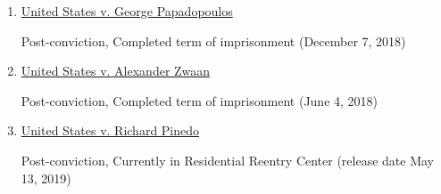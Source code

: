 \begin{enumerate}[1.]

    \item \underline{United States v. George Papadopoulos}

Post-conviction, Completed term of imprisonment (December 7, 2018)

    \item \underline{United States v. Alexander Zwaan}

Post-conviction, Completed term of imprisonment (June 4, 2018)

    \item \underline{United States v. Richard Pinedo}

Post-conviction, Currently in Residential Reentry Center (release date May 13, 2019)

\end{enumerate}
